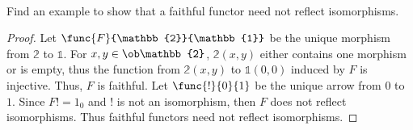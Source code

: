 \documentclass[main.tex]{subfiles}
\begin{document}
\paragraph{}
\begin{exercise}
	Find an example to show that a faithful functor need not reflect
	isomorphisms.
\end{exercise}

\begin{proof}
	Let $\func{F}{\mathbb{2}}{\mathbb{1}}$ be the unique morphism from
	$\mathbb{2}$ to $\mathbb{1}$. For $x,y \in \ob\mathbb{2}$, $\mathbb{2}(x,y)$
	either contains one morphism or is empty, thus the  function from
	$\mathbb{2}(x,y)$ to $\mathbb{1}(0,0)$ induced by $F$ is injective. Thus,
	$F$ is faithful.  Let $\func{!}{0}{1}$ be the unique arrow from $0$ to $1$.
	Since $F! = 1_{0}$ and $!$ is not an isomorphism, then $F$ does not reflect
	isomorphisms. Thus faithful functors need not reflect isomorphisms.
\end{proof}
\end{document}
